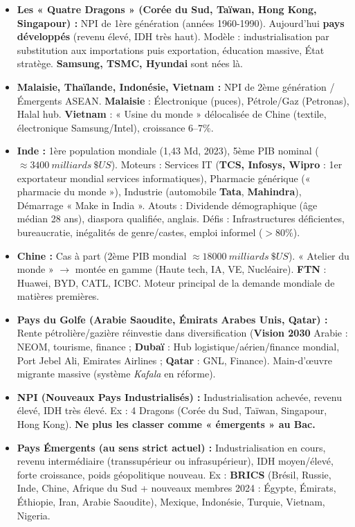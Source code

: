 \documentclass[11pt]{article}
\newcommand{\cle}[1]{{\popxbold\color{popdark}#1}}
\begin{document}
\begin{itemize}
\item \textbf{Les « Quatre Dragons » (Corée du Sud, Taïwan, Hong Kong, Singapour) :} \cle{NPI de 1ère génération} (années 1960-1990). Aujourd'hui \textbf{pays développés} (revenu élevé, IDH très haut). Modèle : industrialisation par substitution aux importations puis exportation, éducation massive, État stratège. \textbf{Samsung, TSMC, Hyundai} sont nées là.
\item \textbf{Malaisie, Thaïlande, Indonésie, Vietnam :} \cle{NPI de 2ème génération} / Émergents ASEAN. \textbf{Malaisie} : Électronique (puces), Pétrole/Gaz (Petronas), Halal hub. \textbf{Vietnam} : « Usine du monde » délocalisée de Chine (textile, électronique Samsung/Intel), croissance $6\text{--}7\%$.
\item \textbf{Inde :} 1ère population mondiale (1,43 Md, 2023), 5ème PIB nominal ($\approx \SI{3400}{milliards}\ \$US$). \cle{Moteurs} : Services IT (\textbf{TCS, Infosys, Wipro} : 1er exportateur mondial services informatiques), Pharmacie générique (« pharmacie du monde »), Industrie (automobile \textbf{Tata}, \textbf{Mahindra}), Démarrage « Make in India ». \cle{Atouts} : Dividende démographique (âge médian 28 ans), diaspora qualifiée, anglais. \cle{Défis} : Infrastructures déficientes, bureaucratie, inégalités de genre/castes, emploi informel ($> 80\%$).
\item \textbf{Chine :} Cas à part (2ème PIB mondial $\approx \SI{18000}{milliards}\ \$US$). « Atelier du monde » $\to$ montée en gamme (Haute tech, IA, VE, Nucléaire). \textbf{FTN} : Huawei, BYD, CATL, ICBC. Moteur principal de la demande mondiale de matières premières.
\item \textbf{Pays du Golfe (Arabie Saoudite, Émirats Arabes Unis, Qatar) :} \cle{Rente pétrolière/gazière} réinvestie dans diversification (\textbf{Vision 2030} Arabie : NEOM, tourisme, finance ; \textbf{Dubaï} : Hub logistique/aérien/finance mondial, Port Jebel Ali, Emirates Airlines ; \textbf{Qatar} : GNL, Finance). Main-d'œuvre migrante massive (système \emph{Kafala} en réforme).
\end{itemize}

\begin{aretenir}
\begin{itemize}
\item \textbf{NPI (Nouveaux Pays Industrialisés) :} Industrialisation achevée, revenu élevé, IDH très élevé. Ex : 4 Dragons (Corée du Sud, Taïwan, Singapour, Hong Kong). \textbf{Ne plus les classer comme « émergents » au Bac.}
\item \textbf{Pays Émergents (au sens strict actuel) :} Industrialisation en cours, revenu intermédiaire (transsupérieur ou infrasupérieur), IDH moyen/élevé, forte croissance, poids géopolitique nouveau. Ex : \textbf{BRICS} (Brésil, Russie, Inde, Chine, Afrique du Sud + nouveaux membres 2024 : Égypte, Émirats, Éthiopie, Iran, Arabie Saoudite), Mexique, Indonésie, Turquie, Vietnam, Nigeria.
\end{itemize}
\end{aretenir}
\end{document}
